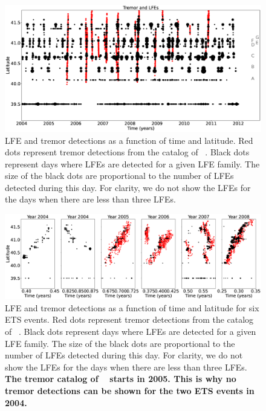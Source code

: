 \documentclass[draft]{agujournal2019}
\begin{document}
\begin{figure}
\noindent\includegraphics[width=\textwidth, trim={0cm 0cm 0cm 0cm},clip]{figures/tremor_nb_perm_3.eps}
\caption{LFE and tremor detections as a function of time and latitude. Red dots represent tremor detections from the catalog of ~. Black dots represent days where LFEs are detected for a given LFE family. The size of the black dots are proportional to the number of LFEs detected during this day. For clarity, we do not show the LFEs for the days when there are less than three LFEs.}
\label{pngfiguresample}
\end{figure}

\begin{figure}
\noindent\includegraphics[width=\textwidth, trim={0cm 0cm 0cm 0cm},clip]{figures/zoom_ETS_events.eps}
\caption{LFE and tremor detections as a function of time and latitude for six ETS events. Red dots represent tremor detections from the catalog of ~. Black dots represent days where LFEs are detected for a given LFE family. The size of the black dots are proportional to the number of LFEs detected during this day. For clarity, we do not show the LFEs for the days when there are less than three LFEs. \textbf{The tremor catalog of ~ starts in 2005. This is why no tremor detections can be shown for the two ETS events in 2004.}}
\label{pngfiguresample}
\end{figure}
\end{document}
